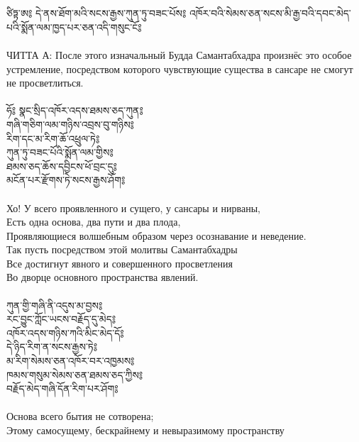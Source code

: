 
\\
\\
{\ti
ཙིཏྟ་ཨ༔ དེ་ནས་ཐོག་མའི་སངས་རྒྱས་ཀུན་ཏུ་བཟང་པོས༔
འཁོར་བའི་སེམས་ཅན་སངས་མི་རྒྱ་བའི་དབང་མེད་པའི་སྨོན་ལམ་ཁྱད་པར་ཅན་འདི་གསུང་ངོ༔}\\
\\
ЧИТТА А: После этого изначальный Будда Самантабхадра произнёс
это особое устремление, посредством которого
чувствующие существа в сансаре не смогут не просветлиться.\\
\\
{\ti
ཧོ༔ སྣང་སྲིད་འཁོར་འདས་ཐམས་ཅད་ཀུན༔\\
གཞི་གཅིག་ལམ་གཉིས་འབྲས་བུ་གཉིས༔ \\
རིག་དང་མ་རིག་ཆོ་འཕྲུལ་ཏེ༔ \\
ཀུན་ཏུ་བཟང་པོའི་སྨོན་ལམ་གྱིས༔ \\
ཐམས་ཅད་ཆོས་དབྱིངས་ཕོ་བྲང་དུ༔ \\
མངོན་པར་རྫོགས་ཏེ་སངས་རྒྱས་ཤོག༔ }\\
\\
Хо! У всего проявленного и сущего, у сансары и нирваны,\\
Есть одна основа, два пути и два плода,\\
Проявляющиеся волшебным образом через осознавание и неведение.\\
Так пусть посредством этой молитвы Самантабхадры\\
Все достигнут явного и совершенного просветления\\
Во дворце основного пространства явлений.\\
\newpage
\\
{\ti
ཀུན་གྱི་གཞི་ནི་འདུས་མ་བྱས༔\\
རང་བྱུང་ཀློང་ཡངས་བརྗོད་དུ་མེད༔\\
འཁོར་འདས་གཉིས་ཀའི་མིང་མེད་དོ༔\\
དེ་ཉིད་རིག་ན་སངས་རྒྱས་ཏེ༔\\
མ་རིག་སེམས་ཅན་འཁོར་བར་འཁྱམས༔\\
ཁམས་གསུམ་སེམས་ཅན་ཐམས་ཅད་ཀྱིས༔\\
བརྗོད་མེད་གཞི་དོན་རིག་པར་ཤོག༔}\\
\\
Основа всего бытия не сотворена;\\
Этому самосущему, бескрайнему и невыразимому пространству \\
